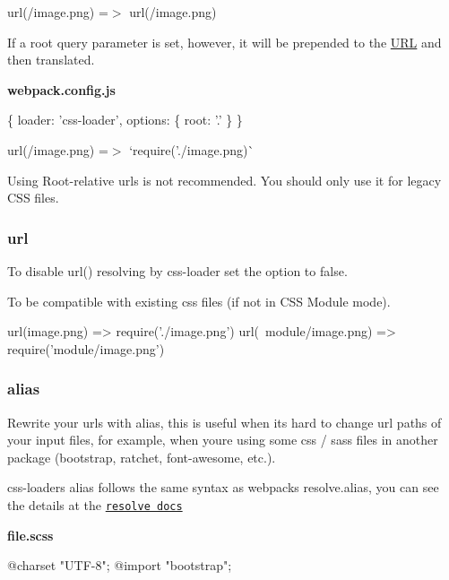 {\ttfamily url(/image.png) =$>$ url(/image.png)}

If a {\ttfamily root} query parameter is set, however, it will be prepended to the \mbox{\hyperlink{namespace_u_r_l}{U\+RL}} and then translated.

{\bfseries webpack.\+config.\+js} 
\begin{DoxyCode}
\{
  loader: 'css-loader',
  options: \{ root: '.' \}
\}
\end{DoxyCode}


{\ttfamily url(/image.png)} =$>$ `require('./image.png\textquotesingle{})\`{}

Using \textquotesingle{}Root-\/relative\textquotesingle{} urls is not recommended. You should only use it for legacy C\+SS files.

\subsubsection*{{\ttfamily url}}

To disable {\ttfamily url()} resolving by {\ttfamily css-\/loader} set the option to {\ttfamily false}.

To be compatible with existing css files (if not in C\+SS Module mode).


\begin{DoxyCode}
url(image.png) => require('./image.png')
url(~module/image.png) => require('module/image.png')
\end{DoxyCode}


\subsubsection*{{\ttfamily alias}}

Rewrite your urls with alias, this is useful when it\textquotesingle{}s hard to change url paths of your input files, for example, when you\textquotesingle{}re using some css / sass files in another package (bootstrap, ratchet, font-\/awesome, etc.).

{\ttfamily css-\/loader}\textquotesingle{}s {\ttfamily alias} follows the same syntax as webpack\textquotesingle{}s {\ttfamily resolve.\+alias}, you can see the details at the \href{https://webpack.js.org/configuration/resolve/#resolve-alias}{\tt resolve docs}

{\bfseries file.\+scss} 
\begin{DoxyCode}
@charset "UTF-8";
@import "bootstrap";
\end{DoxyCode}



